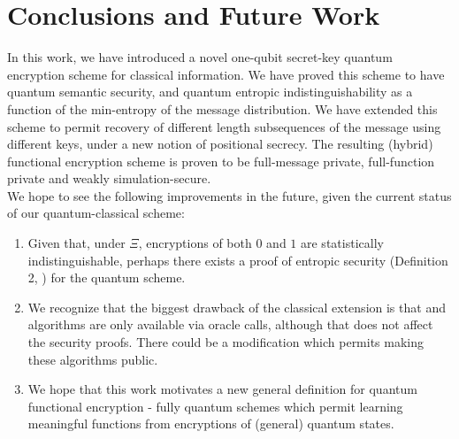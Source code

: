 \section{Conclusions and Future Work}

In this work, we have introduced a novel one-qubit secret-key quantum encryption scheme for classical information. We have proved this scheme to have quantum semantic security, and quantum entropic indistinguishability as a function of the min-entropy of the message distribution. We have extended this scheme to permit recovery of different length subsequences of the message using different keys, under a new notion of positional secrecy. The resulting (hybrid) functional encryption scheme is proven to be full-message private, full-function private and weakly simulation-secure. \\
We hope to see the following improvements in the future, given the current status of our quantum-classical scheme: \\
\begin{enumerate}
\vspace*{-10pt}
\item Given that, under $\Xi$, encryptions of both $0$ and $1$ are statistically indistinguishable, perhaps there exists a proof of entropic security (Definition 2, \cite{entsec}) for the quantum scheme.
\item We recognize that the biggest drawback of the classical extension is that \kgen and \enc algorithms are only available via oracle calls, although that does not affect the security proofs. There could be a modification which permits making these algorithms public. 
\item We hope that this work motivates a new general definition for quantum functional encryption - fully quantum schemes which permit learning meaningful functions from encryptions of (general) quantum states.
\end{enumerate}